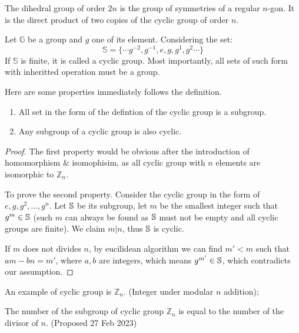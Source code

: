 \documentclass[../note.tex]{subfiles}
\begin{document}
\begin{definition}
	The dihedral group of order $2n$ is the group of symmetries of a regular $n$-gon. It is the direct product of two copies of the cyclic group of order $n$.
\end{definition}

\begin{definition}
Let $\mathbb{G}$ be a group and $g$ one of its element. Considering the set:
\[
	\mathbb{S} = \{\cdots g^{-2}, g^{-1}, e, g, g^1, g^2 \cdots\}  
\]
If $\mathbb{S}$ is finite, it is called a cyclic group. Most importantly, all sets of such form with inheritted operation must be a group.
\end{definition}

\begin{theorem}
Here are some properties immediately follows the definition.
\begin{enumerate}
	\item All set in the form of the defintion of the cyclic group is a subgroup.
	\item \label{Cyclic_Inheritance}Any subgroup of a cyclic group is also cyclic.
\end{enumerate}	
\end{theorem}

\begin{proof}
	The first property would be obvious after the introduction of homomorphism \& isomophisim, as all cyclic group with $n$ elements are isomorphic to $\mathbb{Z}_n$.
	
	To prove the second property. Consider the cyclic group in the form of $e, g, g^2, \dots, g^n$. Let $\mathbb{S}$ be its subgroup, let $m$ be the smallest integer such that $g^m \in \mathbb{S}$ (such $m$ can always be found as $\mathbb{S}$ must not be empty and all cyclic groups are finite). We claim $m|n$, thus $\mathbb{S}$ is cyclic.

	If $m$ does not divides $n$, by eucilidean algorithm we can find $m'<m$ such that $am-bn=m'$, where $a,b$ are integers, which means $g^{m'}\in \mathbb{S}$, which contradicts our assumption.
\end{proof}

\begin{example}
An example of cyclic group is $\mathbb{Z}_n$. (Integer under modular $n$ addition);
\end{example}

\begin{proposition}
	The number of the subgroup of cyclic group $\mathbb{Z}_n$ is equal to the number of the divisor of $n$. (Proposed 27 Feb 2023)
\end{proposition}
\end{document}
